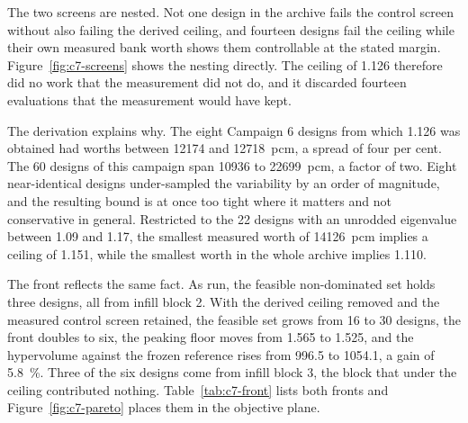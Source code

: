 The two screens are nested. Not one design in the archive fails the
control screen without also failing the derived ceiling, and fourteen
designs fail the ceiling while their own measured bank worth shows them
controllable at the stated margin. Figure~\ref{fig:c7-screens} shows
the nesting directly. The ceiling of 1.126 therefore did no work that
the measurement did not do, and it discarded fourteen evaluations that
the measurement would have kept.

The derivation explains why. The eight Campaign 6 designs from which
1.126 was obtained had worths between \num{12174} and
\SI{12718}{pcm}, a spread of four per cent. The 60 designs of this
campaign span \num{10936} to \SI{22699}{pcm}, a factor of two. Eight
near-identical designs under-sampled the variability by an order of
magnitude, and the resulting bound is at once too tight where it
matters and not conservative in general. Restricted to the 22 designs
with an unrodded eigenvalue between 1.09 and 1.17, the smallest
measured worth of \SI{14126}{pcm} implies a ceiling of 1.151, while the
smallest worth in the whole archive implies 1.110.

The front reflects the same fact. As run, the feasible non-dominated set
holds three designs, all from infill block 2. With the derived ceiling
removed and the measured control screen retained, the feasible set grows
from 16 to 30 designs, the front doubles to six, the peaking floor moves
from 1.565 to 1.525, and the hypervolume against the frozen reference
rises from 996.5 to 1054.1, a gain of \SI{5.8}{\%}. Three of the six
designs come from infill block 3, the block that under the ceiling
contributed nothing. Table~\ref{tab:c7-front} lists both fronts and
Figure~\ref{fig:c7-pareto} places them in the objective plane.

